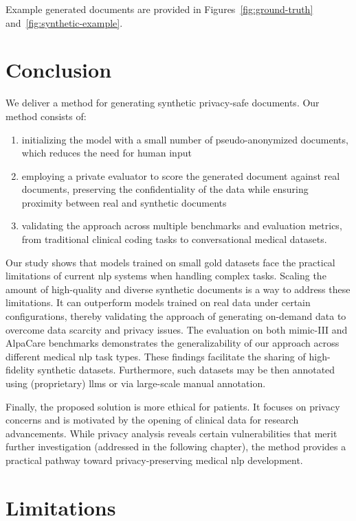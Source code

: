 Example generated documents are provided in Figures~\ref{fig:ground-truth} and~\ref{fig:synthetic-example}.

\section{Conclusion}
We deliver a method for generating synthetic privacy-safe documents. Our method consists of:
\begin{enumerate}
\item initializing the model with a small number of pseudo-anonymized documents, which reduces the need for human input
\item employing a private evaluator to score the generated document against real documents, preserving the confidentiality of the data while ensuring proximity between real and synthetic documents
\item validating the approach across multiple benchmarks and evaluation metrics, from traditional clinical coding tasks to conversational medical datasets.
\end{enumerate}

Our study shows that models trained on small gold datasets face the practical limitations of current \gls{nlp} systems when handling complex tasks. Scaling the amount of high-quality and diverse synthetic documents is a way to address these limitations. It can outperform models trained on real data under certain configurations, thereby validating the approach of generating on-demand data to overcome data scarcity and privacy issues. The evaluation on both \gls{mimic}-III and AlpaCare benchmarks demonstrates the generalizability of our approach across different medical \gls{nlp} task types. These findings facilitate the sharing of high-fidelity synthetic datasets. Furthermore, such datasets may be then annotated using (proprietary) \glspl{llm} or via large-scale manual annotation.

Finally, the proposed solution is more ethical for patients. It focuses on privacy concerns and is motivated by the opening of clinical data for research advancements. While privacy analysis reveals certain vulnerabilities that merit further investigation (addressed in the following chapter), the method provides a practical pathway toward privacy-preserving medical \gls{nlp} development.

\section{Limitations}

